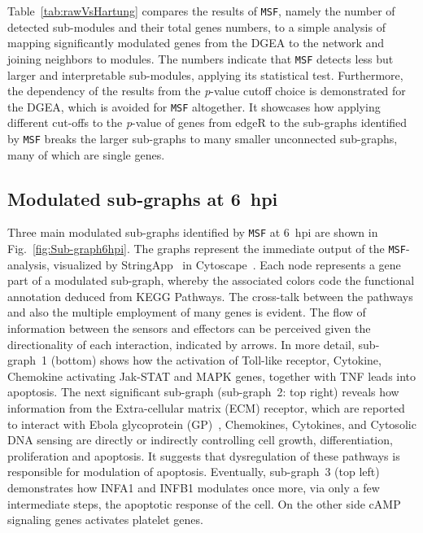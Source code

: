 \documentclass[10pt,a4paper,twocolumn]{article}
\begin{document}
	Table~\ref{tab:rawVsHartung} compares the results of
        \texttt{MSF}, namely the number of detected sub-modules and
        their total genes numbers, to a simple analysis of mapping
        significantly modulated genes from the DGEA to the network and
        joining neighbors to modules. The numbers indicate that
        \texttt{MSF} detects less but larger and interpretable
        sub-modules, applying its statistical test. Furthermore, the
        dependency of the results from the \textit{p}-value cutoff
        choice is demonstrated for the DGEA, which is avoided for
        \texttt{MSF} altogether. It showcases how applying different
        cut-offs to the \textit{p}-value of genes from edgeR to the
        sub-graphs identified by \texttt{MSF} breaks the larger
        sub-graphs to many smaller unconnected sub-graphs, many of
        which are single genes.
	
	\subsection*{Modulated sub-graphs at 6~hpi}
	
	Three main modulated sub-graphs identified by \texttt{MSF} at
        6~hpi are shown in Fig.~\ref{fig:Sub-graph6hpi}. The graphs
        represent the immediate output of the \texttt{MSF}-analysis,
        visualized by StringApp~\cite{StringApp} in
        Cytoscape~\cite{Cyto}. Each node represents a gene part of a
        modulated sub-graph, whereby the associated colors code the
        functional annotation deduced from KEGG Pathways. The
        cross-talk between the pathways and also the multiple
        employment of many genes is evident. The flow of information
        between the sensors and effectors can be perceived given the
        directionality of each interaction, indicated by arrows.  In
        more detail, sub-graph~1 (bottom) shows how the activation of
        Toll-like receptor, Cytokine, Chemokine activating Jak-STAT
        and MAPK genes, together with TNF leads into apoptosis. The
        next significant sub-graph (sub-graph~2: top right) reveals
        how information from the Extra-cellular matrix (ECM) receptor,
        which are reported to interact with Ebola glycoprotein
        (GP)~\cite{Veljkovic}, Chemokines, Cytokines, and Cytosolic
        DNA sensing are directly or indirectly controlling cell
        growth, differentiation, proliferation and apoptosis. It
        suggests that dysregulation of these pathways is responsible
        for modulation of apoptosis. Eventually, sub-graph~3 (top
        left) demonstrates how INFA1 and INFB1 modulates once more,
        via only a few intermediate steps, the apoptotic response of
        the cell. On the other side cAMP signaling genes activates
        platelet genes.
	
\end{document}
